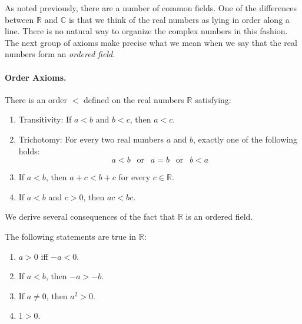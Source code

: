 As noted previously, there are a number of common fields. One of the differences between $\mathbb R$ and $\mathbb C$ is that we think of the real numbers as lying in order along a line. There is no natural way to organize the complex numbers in this fashion. The next group of axioms make precise what we mean when we say that the real numbers form an \emph{ordered field}. 

\paragraph{Order Axioms.} There is an order $<$ defined on the real numbers $\mathbb R$ satisfying: 
\begin{enumerate}
\item Transitivity: If $a<b$ and $b<c$, then $a<c$.
\item Trichotomy: For every two real numbers $a$ and $b$, exactly one of the following holds: 
\begin{equation*}
a<b \ \ \text{ or } \ \ a=b \ \ \text{ or } \ \ b<a
\end{equation*}
\item If $a<b$, then $a+c<b+c$ for every $c\in\mathbb R$.
\item If $a<b$ and $c>0$, then $ac<bc$. \label{ax:orderprod}
\end{enumerate}

We derive several consequences of the fact that $\mathbb R$ is an ordered field.

\begin{thrm} \label{thrm:orderbasic}
The following statements are true in $\mathbb R$:
\begin{enumerate}
\item $a>0$ iff $-a<0$. \label{thrm:posneg}
\item If $a<b$, then $-a>-b$. \label{thrm:ineqflip}
\item If $a\neq0$, then $a^2>0$. \label{thrm:possqr}
\item $1>0$. \label{thrm:onegtzero}
\end{enumerate}
\end{thrm}

